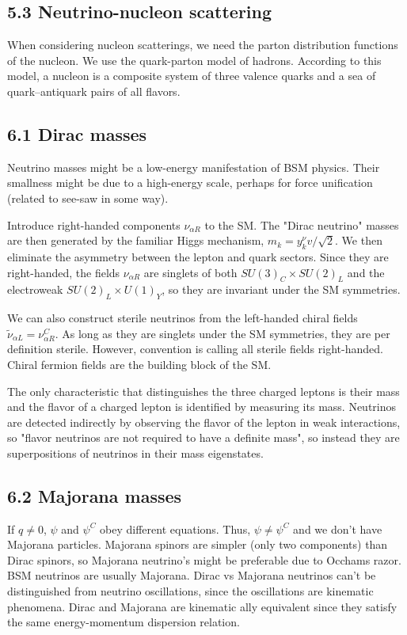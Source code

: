 \documentclass[twocolumn]{article}
\begin{document}
\subsection*{5.3 Neutrino-nucleon scattering}
When considering nucleon scatterings, we need the parton distribution functions of the nucleon. We use the quark-parton model of hadrons. According to this model, a nucleon is a composite system of
three valence quarks and a sea of quark–antiquark pairs of all flavors.

\subsection*{6.1 Dirac masses}
Neutrino masses might be a low-energy manifestation of BSM physics. Their smallness might be due to a high-energy scale, perhaps for force unification (related to see-saw in some way).

Introduce right-handed components $\nu_{\alpha R}$ to the SM. The "Dirac neutrino" masses are then generated by the familiar Higgs mechanism, $m_k = y^\nu_k v / \sqrt{2}$. We then eliminate the asymmetry between the lepton and quark sectors. Since they are right-handed, the fields $\nu_{\alpha R}$ are singlets of both $SU(3)_C \times SU(2)_L$ and the electroweak $SU(2)_L \times U(1)_Y$, so they are invariant under the SM symmetries.


We can also construct sterile neutrinos from the left-handed chiral fields $\tilde{\nu}_{\alpha L} = \nu^C_{\alpha R}$. As long as they are singlets under the SM symmetries, they are per definition sterile. However, convention is calling all sterile fields right-handed. Chiral fermion fields are the building block of the SM.

The only characteristic that distinguishes the three charged
leptons is their mass and the flavor of a charged lepton is identified by measuring its
mass. Neutrinos are detected indirectly by observing the flavor of the lepton in weak interactions, so "flavor neutrinos are not required to have a definite mass", so instead they are superpositions of neutrinos in their mass eigenstates.

\subsection*{6.2 Majorana masses}
If $q \neq 0$, $\psi$ and $\psi^C$ obey different equations. Thus, $\psi \neq \psi^C$ and we don't have Majorana particles. Majorana spinors are simpler (only two components) than Dirac spinors, so Majorana neutrino's might be preferable due to Occhams razor. BSM neutrinos are usually Majorana. Dirac vs Majorana neutrinos can't be distinguished from neutrino oscillations, since the oscillations are kinematic phenomena. Dirac and Majorana are kinematic ally equivalent since they satisfy the same energy-momentum dispersion relation.  
\end{document}
